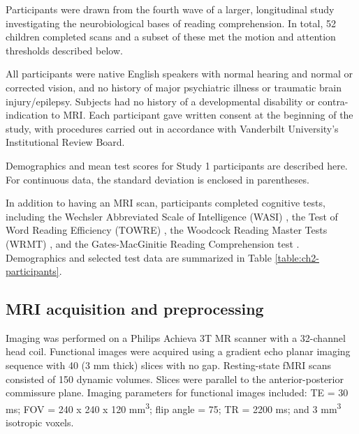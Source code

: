 \begin{itmeize}
Participants were drawn from the fourth wave of a larger, longitudinal study investigating the neurobiological bases of reading comprehension. In total, 52 children completed scans and a subset of these met the motion and attention thresholds described below.

All participants were native English speakers with normal hearing and normal or corrected vision, and no history of major psychiatric illness or traumatic brain injury/epilepsy. Subjects had no history of a developmental disability or contra-indication to MRI.  Each participant gave written consent at the beginning of the study, with procedures carried out in accordance with Vanderbilt University’s Institutional Review Board.

\begin{table}
    \renewcommand{\tabcolsep}{0.09cm}
    \centering
    
    \caption[Participant demographics]{Demographics and mean test scores for Study 1 participants are described here. For continuous data, the standard deviation is enclosed in parentheses.}
    \label{table:ch2-participants}
\end{table}

In addition to having an MRI scan, participants completed cognitive tests, including the Wechsler Abbreviated Scale of Intelligence (WASI) \citep{Kaplan1999}, the Test of Word Reading Efficiency (TOWRE) \citep{Torgesen2012}, the Woodcock Reading Master Tests (WRMT) \citep{Woodcock1998}, and the Gates-MacGinitie Reading Comprehension test \citep{MacGinitie2000}. Demographics and selected test data are summarized in Table \ref{table:ch2-participants}.

\subsection{MRI acquisition and preprocessing}

Imaging was performed on a Philips Achieva 3T MR scanner with a 32-channel head coil. Functional images were acquired using a gradient echo planar imaging sequence with 40 (3 mm thick) slices with no gap. Resting-state fMRI scans consisted of 150 dynamic volumes. Slices were parallel to the anterior-posterior commissure plane. Imaging parameters for functional images included: TE = 30 ms; FOV = 240 x 240 x 120 mm\textsuperscript{3}; flip angle = 75\degree; TR = 2200 ms; and 3 mm\textsuperscript{3} isotropic voxels.


\end{itmeize}
